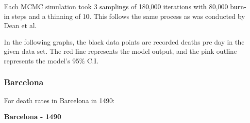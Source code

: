 \documentclass [letterpaper, 12pt] {article}
\begin{document}
Each MCMC simulation took 3 samplings of 180,000 iterations with 80,000 burn-in steps and a thinning of 10. This follows the same process as was conducted by Dean et al.

In the following graphs, the black data points are recorded deaths pre day in the given data set. The red line represents the model output, and the pink outline represents the model's 95\% C.I. 

\newpage

\subsubsection{Barcelona}
For death rates in Barcelona in 1490:

\begin{center}
\textbf{Barcelona - 1490}
\end{center}
\end{document}
